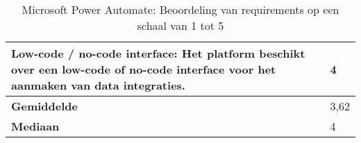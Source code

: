 \begin{landscape}
\begin{table}[H]
{\begin{tabular}{|ll|}
\multicolumn{1}{|l|}{Low-code / no-code interface: Het platform beschikt over een low-code of no-code interface voor het aanmaken van data integraties.}                                                                   & 4                            \\ \hline
\multicolumn{1}{|l|}{\textbf{Gemiddelde}}                                                                                                                                                                                  & 3,62                            \\ \hline
\multicolumn{1}{|l|}{\textbf{Mediaan}}                                                                                                                                                                                     & 4                            \\ \hline
\end{tabular}
}
\caption{Microsoft Power Automate: Beoordeling van requirements op een schaal van 1 tot 5}
\end{table}

\end{landscape}

